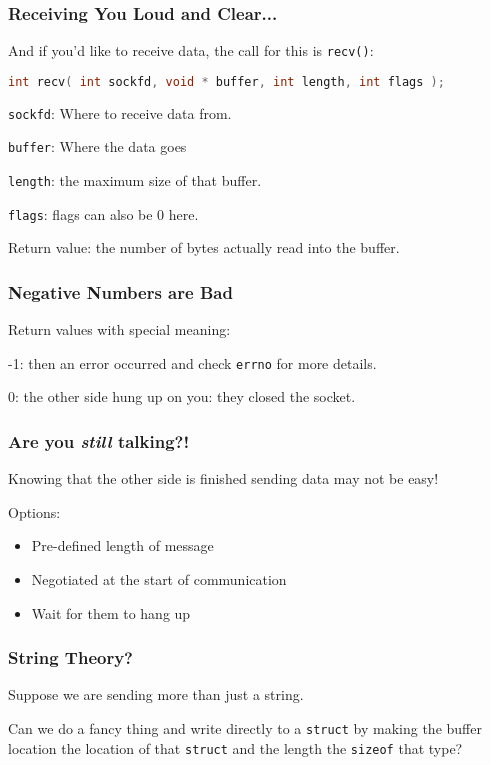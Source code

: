 \begin{frame}[fragile]
	\frametitle{Receiving You Loud and Clear...}

	And if you'd like to receive data, the call for this is \texttt{recv()}:

	\begin{lstlisting}[language=C]
int recv( int sockfd, void * buffer, int length, int flags );
\end{lstlisting}

	\texttt{sockfd}: Where to receive data from.

	\texttt{buffer}: Where the data goes

	\texttt{length}: the maximum size of that buffer.

	\texttt{flags}: flags can also be 0 here.

	Return value: the number of bytes actually read into the buffer.

\end{frame}

\begin{frame}
	\frametitle{Negative Numbers are Bad}

	Return values with special meaning:

	-1:  then an error occurred and check \texttt{errno} for more details.

	0: the other side hung up on you: they closed the socket.
\end{frame}

\begin{frame}
	\frametitle{Are you \textit{still} talking?!}

	Knowing that the other side is finished sending data may not be easy!

	Options:

	\begin{itemize}
		\item Pre-defined length of message
		\item Negotiated at the start of communication
		\item Wait for them to hang up
	\end{itemize}

\end{frame}



\begin{frame}
	\frametitle{String Theory?}
	Suppose we are sending more than just a string.

	Can we do a fancy thing and write directly to a \texttt{struct} by making the buffer location the location of that \texttt{struct} and the length the \texttt{sizeof} that type?

\end{frame}



